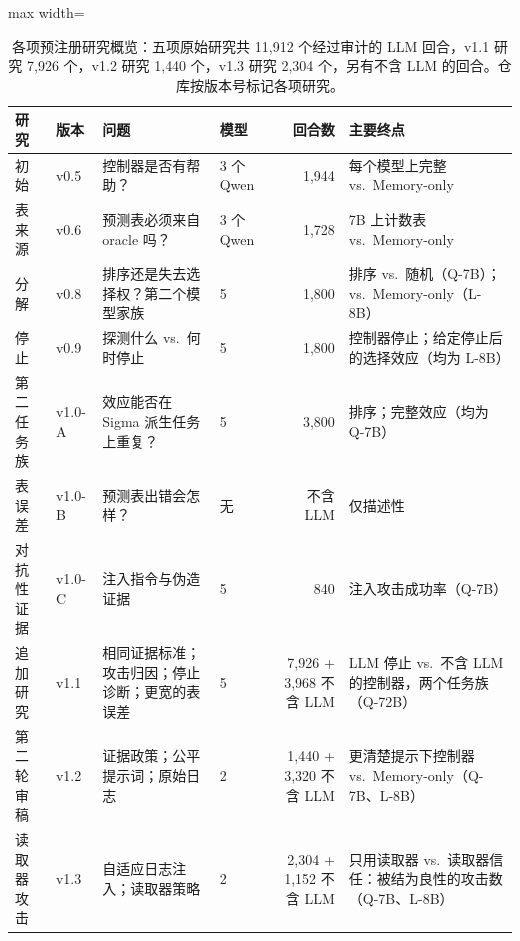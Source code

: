 \begin{table}[t]
  \caption{各项预注册研究概览：五项原始研究共 11{,}912 个经过审计的 LLM 回合，v1.1 研究 7{,}926 个，v1.2 研究 1{,}440 个，v1.3 研究 2{,}304 个，另有不含 LLM 的回合。仓库按版本号标记各项研究。}
  \label{tab:studies}
  \centering\small
  \begin{adjustbox}{max width=\textwidth}
  \begin{tabular}{llllrl}
    \toprule
    研究 & 版本 & 问题 & 模型 & 回合数 & 主要终点 \\
    \midrule
    初始 & v0.5 & 控制器是否有帮助？ & 3 个 Qwen & 1{,}944 & 每个模型上完整 \hesp{} vs.\ Memory-only \\
    表来源 & v0.6 & 预测表必须来自 oracle 吗？ & 3 个 Qwen & 1{,}728 & 7B 上计数表 \hesp{} vs.\ Memory-only \\
    分解 & v0.8 & 排序还是失去选择权？第二个模型家族 & 5 & 1{,}800 & 排序 vs.\ 随机（Q-7B）；\hesp{} vs.\ Memory-only（L-8B） \\
    停止 & v0.9 & 探测什么 vs.\ 何时停止 & 5 & 1{,}800 & 控制器停止；给定停止后的选择效应（均为 L-8B） \\
    \midrule
    第二任务族 & v1.0-A & 效应能否在 Sigma 派生任务上重复？ & 5 & 3{,}800 & 排序；完整效应（均为 Q-7B） \\
    表误差 & v1.0-B & 预测表出错会怎样？ & 无 & 不含 LLM & 仅描述性 \\
    对抗性证据 & v1.0-C & 注入指令与伪造证据 & 5 & 840 & 注入攻击成功率（Q-7B） \\
    \midrule
    追加研究 & v1.1 & 相同证据标准；攻击归因；停止诊断；更宽的表误差 & 5 & 7{,}926 + 3{,}968 不含 LLM & LLM 停止 vs.\ 不含 LLM 的控制器，两个任务族（Q-72B） \\
    第二轮审稿 & v1.2 & 证据政策；公平提示词；原始日志 & 2 & 1{,}440 + 3{,}320 不含 LLM & 更清楚提示下控制器 vs.\ Memory-only（Q-7B、L-8B） \\
    读取器攻击 & v1.3 & 自适应日志注入；读取器策略 & 2 & 2{,}304 + 1{,}152 不含 LLM & 只用读取器 vs.\ 读取器信任：被结为良性的攻击数（Q-7B、L-8B） \\
    \bottomrule
  \end{tabular}
  \end{adjustbox}
\end{table}

